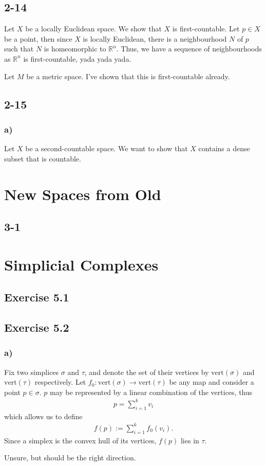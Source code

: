 \documentclass[a4paper]{book}
\theoremstyle{definition}
\begin{document}
\section*{2-14}
Let \(X\) be a locally Euclidean space. We show that \(X\) is first-countable. Let \(p \in X\) be a point, then since \(X\) is locally Euclidean, there is a neighbourhood \(N\) of \(p\) such that \(N\) is homeomorphic to \(\mathbb{R}^n\). Thus, we have a sequence of neighbourhoods as \(\mathbb{R}^n\) is first-countable, yada yada yada.

\noindent Let \(M\) be a metric space. I've shown that this is first-countable already.

\section*{2-15}
\subsection*{a)}
Let \(X\) be a second-countable space. We want to show that \(X\) contains a dense subset that is countable.

\chapter{New Spaces from Old}
\section*{3-1}

\chapter{Simplicial Complexes}

\section*{Exercise 5.1}

\section*{Exercise 5.2}
\subsection*{a)}

Fix two simplices \(\sigma\) and \(\tau\), and denote the set of their vertices by \(\mathrm{vert}(\sigma)\) and \(\mathrm{vert}(\tau)\) respectively. Let \(f_0: \mathrm{vert}(\sigma) \longrightarrow \mathrm{vert}(\tau)\) be any map and consider a point \(p \in \sigma\). \(p\) may be represented by a linear combination of the vertices, thus
\begin{align*}
    p = \sum_{i=1}^k v_i
\end{align*}
which allows us to define
\begin{align*}
    f(p) := \sum_{i=1}^k f_0(v_i) \text{.}
\end{align*}
Since a simplex is the convex hull of its vertices, \(f(p)\) lies in \(\tau\).

Unsure, but should be the right direction.
\end{document}
